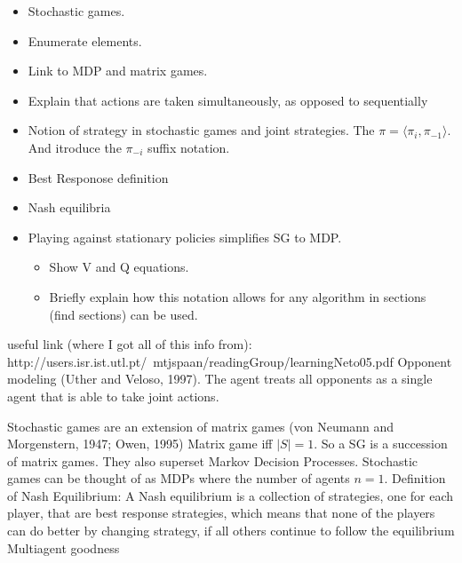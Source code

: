 \documentclass{../main.tex}{subfiles}
\begin{document}
\begin{itemize}
\item Stochastic games.
\item Enumerate elements.
\item Link to MDP and matrix games.
\item Explain that actions are taken simultaneously, as opposed to sequentially
\item Notion of strategy in stochastic games and joint strategies. The $ \pi = \langle \pi_i, \pi_{-1} \rangle $. And itroduce the $\pi_{-i}$ suffix notation.
\item Best Responose definition
\item Nash equilibria
\item Playing against stationary policies simplifies SG to MDP.%
    \begin{itemize}
    \item Show V and Q equations.
    \item Briefly explain how this notation allows for any algorithm in sections (find sections) can be used.
    \end{itemize}
\end{itemize}

useful link (where I got all of this info from): http://users.isr.ist.utl.pt/~mtjspaan/readingGroup/learningNeto05.pdf
Opponent modeling (Uther and Veloso, 1997). The agent treats all opponents as a single agent that is able to take joint actions.

Stochastic games are an extension of matrix games  (von Neumann and Morgenstern, 1947; Owen, 1995) Matrix game iff $\mid S \mid = 1$. So a SG is a succession of matrix games. They also superset Markov Decision Processes. Stochastic games can be thought of as MDPs where the number of agents $n = 1$. 
Definition of Nash Equilibrium: A Nash equilibrium is a collection of strategies, one for each player, that are best response strategies, which means that none of the players can do better by changing strategy, if all others continue to follow the equilibrium
Multiagent goodness
\end{document}
